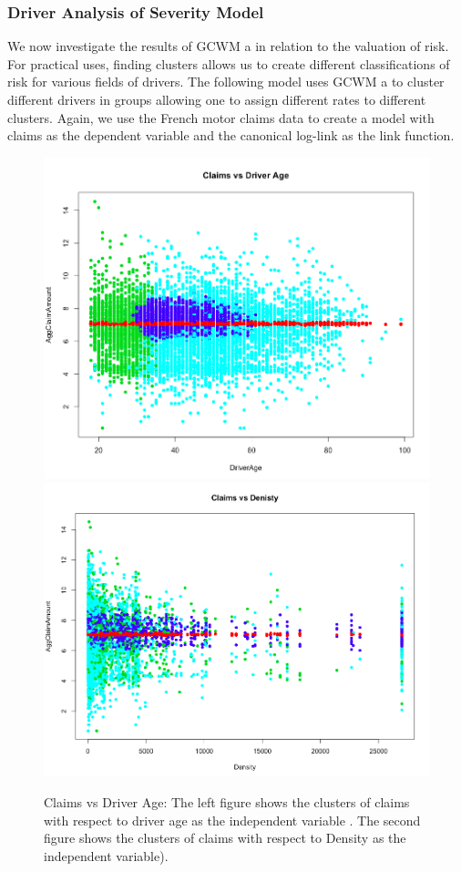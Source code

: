 \documentclass[11pt,letterpaper]{article}
\numberwithin{equation}{section}
\numberwithin{equation}{section}
\numberwithin{equation}{section}
\begin{document}
\subsubsection{Driver Analysis of Severity Model}

	We now investigate the results of GCWM a in relation to the valuation of risk. For practical uses, finding clusters allows us to create different classifications of risk for various fields of drivers. The following model uses GCWM a to cluster different drivers in groups allowing one to assign different rates to different clusters. Again, we use the French motor claims data to create a model with claims as the dependent variable and the canonical log-link as the link function. 
\begin{figure}[!htb]
\begin{center}
\includegraphics[scale=0.24]{clms.png}
\includegraphics[scale=0.24]{dens.png}
\end{center}
\caption{Claims vs Driver Age: The left figure shows the clusters of claims with respect to driver age as the independent variable . The second figure shows the clusters of claims with respect to Density as the independent variable).}
\label{fig:vet1}
\end{figure}
\end{document}
